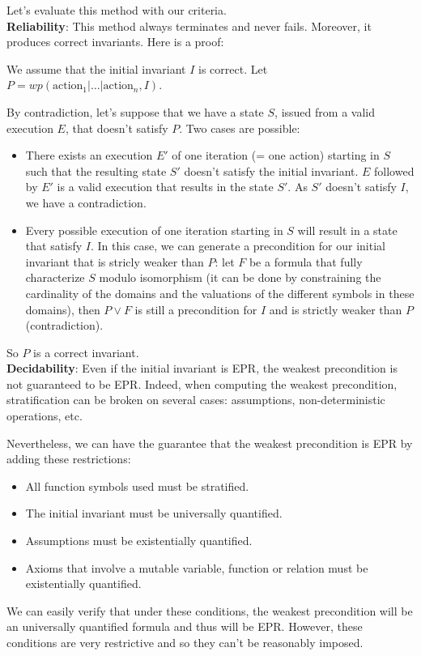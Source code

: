 \documentclass[11pt,a4paper,oldfontcommands,openany]{memoir}
\begin{document}
    Let's evaluate this method with our criteria.\\
    
    \textbf{Reliability}: This method always terminates and never fails. Moreover, it produces correct invariants. Here is a proof:

    We assume that the initial invariant \(I\) is correct. Let \(P = wp(\text{action}_1|\ldots|\text{action}_n,I)\).

    By contradiction, let's suppose that we have a state \(S\), issued from a valid execution \(E\), that doesn't satisfy \(P\).
    Two cases are possible:
    \begin{itemize}
        \item There exists an execution \(E'\) of one iteration (= one action) starting in \(S\) such that the resulting state \(S'\) doesn't satisfy the initial invariant.
        \(E\) followed by \(E'\) is a valid execution that results in the state \(S'\). As \(S'\) doesn't satisfy \(I\), we have a contradiction.
        \item Every possible execution of one iteration starting in \(S\) will result in a state that satisfy \(I\).
        In this case, we can generate a precondition for our initial invariant that is stricly weaker than \(P\):
        let \(F\) be a formula that fully characterize \(S\) modulo isomorphism (it can be done by constraining the cardinality of the domains and the valuations of the different symbols in these domains),
        then \(P \lor F\) is still a precondition for \(I\) and is strictly weaker than \(P\) (contradiction). 
    \end{itemize}

    So \(P\) is a correct invariant.\\

    \textbf{Decidability}: Even if the initial invariant is EPR, the weakest precondition is not guaranteed to be EPR.
    Indeed, when computing the weakest precondition, stratification can be broken on several cases: assumptions, non-deterministic operations, etc.

    Nevertheless, we can have the guarantee that the weakest precondition is EPR by adding these restrictions:
    \begin{itemize}
        \item All function symbols used must be stratified.
        \item The initial invariant must be universally quantified.
        \item Assumptions must be existentially quantified.
        \item Axioms that involve a mutable variable, function or relation must be existentially quantified.
    \end{itemize}
    We can easily verify that under these conditions, the weakest precondition will be an universally quantified formula
    and thus will be EPR. However, these conditions are very restrictive and so they can't be reasonably imposed.
    \\
\end{document}
